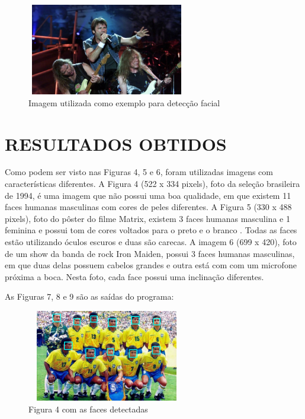 \documentclass[conference]{IEEEtran}
\begin{document}
         \begin{figure}[h!b]
			\centering \includegraphics[width=7cm,height=4cm]{iron.jpg}
			\caption{Imagem utilizada como exemplo para detecção facial \cite{b7}} 
		\end{figure}

	\section{RESULTADOS OBTIDOS}
        Como podem ser visto nas Figuras 4, 5 e 6, foram utilizadas imagens com características diferentes. A Figura 4 (522 x 334 pixels), foto da seleção brasileira de 1994, é uma imagem que não possui uma boa qualidade, em que existem 11 faces humanas masculinas com cores de peles diferentes. A Figura 5 (330 x 488 pixels), foto do pôster do filme Matrix, existem 3 faces humanas masculina e 1 feminina e possui tom de cores voltados para o preto e o branco . Todas as faces estão utilizando óculos escuros e duas são carecas. A imagem 6 (699 x 420), foto de um show da banda de rock Iron Maiden, possui 3 faces humanas masculinas, em que duas delas possuem cabelos grandes e outra está com com um microfone próxima a boca. Nesta foto, cada face possui uma inclinação diferentes. 
        
        
		As Figuras 7, 8 e 9 são as saídas do programa:
		
		 \begin{figure}[h!b]
			\centering \includegraphics[width=7cm,height=4cm]{brasil_1994_detectada.png}
			\caption{Figura 4 com as faces detectadas} 
		\end{figure}
		
\end{document}
